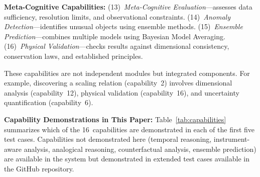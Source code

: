 \documentclass[usenatbib]{rasti}
\begin{document}
\textbf{Meta-Cognitive Capabilities:}
(13)~\emph{Meta-Cognitive Evaluation}---assesses data sufficiency, resolution limits, and observational constraints.
(14)~\emph{Anomaly Detection}---identifies unusual objects using ensemble methods.
(15)~\emph{Ensemble Prediction}---combines multiple models using Bayesian Model Averaging.
(16)~\emph{Physical Validation}---checks results against dimensional consistency, conservation laws, and established principles.

These capabilities are not independent modules but integrated components.
For example, discovering a scaling relation (capability~2) involves dimensional analysis (capability~12), physical validation (capability~16), and uncertainty quantification (capability~6).

\textbf{Capability Demonstrations in This Paper:}
Table~\ref{tab:capabilities} summarizes which of the 16~capabilities are demonstrated in each of the first five test cases.
Capabilities not demonstrated here (temporal reasoning, instrument-aware analysis, analogical reasoning, counterfactual analysis, ensemble prediction) are available in the system but demonstrated in extended test cases available in the GitHub repository.
\end{document}
